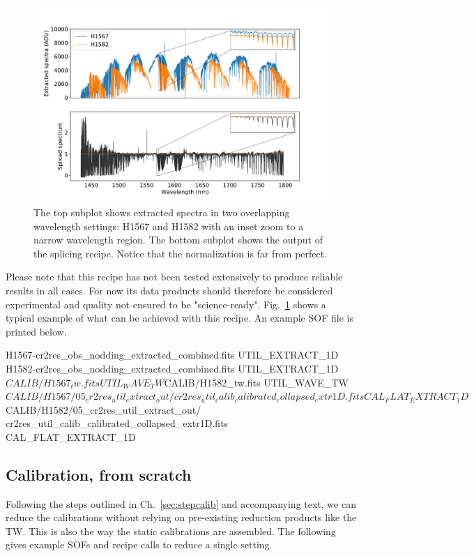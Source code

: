 \begin{figure}[!h]
  \begin{center}
    \includegraphics[width=1\textwidth]{figures/util_splice}
  \end{center}
  \caption{
    \label{fig:util_splice}
    The top subplot shows extracted spectra in two overlapping
    wavelength settings: H1567 and H1582 with an inset zoom to a narrow
    wavelength region. The bottom subplot shows the output of the splicing
    recipe. Notice that the normalization is far from perfect.}
\end{figure}

Please note that this recipe has not been tested extensively to produce reliable
results in all cases. For now its data products should therefore be considered
experimental and quality not ensured to be "science-ready". Fig.~\ref{fig:util_splice}
shows a typical example of what can be achieved with this recipe. An example SOF
file is printed below.

\begin{shell}[fontsize=\small]
H1567-cr2res_obs_nodding_extracted_combined.fits UTIL_EXTRACT_1D
H1582-cr2res_obs_nodding_extracted_combined.fits UTIL_EXTRACT_1D
$CALIB/H1567_tw.fits UTIL_WAVE_TW
$CALIB/H1582_tw.fits UTIL_WAVE_TW
$CALIB/H1567/05_cr2res_util_extract_out/
  cr2res_util_calib_calibrated_collapsed_extr1D.fits CAL_FLAT_EXTRACT_1D
$CALIB/H1582/05_cr2res_util_extract_out/
  cr2res_util_calib_calibrated_collapsed_extr1D.fits CAL_FLAT_EXTRACT_1D
\end{shell}


\subsection{Calibration, from scratch}
\label{sec:calibscratch}
Following the steps outlined in Ch.~\ref{sec:stepcalib} and accompanying text,
we can reduce the calibrations without relying on pre-existing reduction
products like the TW. This is also the way the static calibrations are
assembled. The following gives example SOFs and recipe calls to reduce a single
setting.

